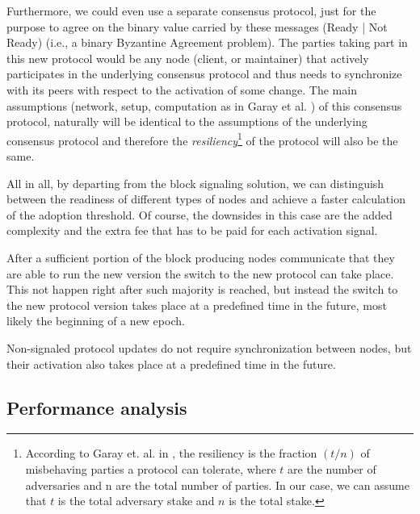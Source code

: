 \documentclass[11pt,a4paper]{article}
\begin{document}
Furthermore, we could even use a separate consensus protocol, just for the
purpose to agree on the binary value carried by these messages (Ready | Not
Ready) (i.e., a binary Byzantine Agreement problem). The parties taking part in
this new protocol would be any node (client, or maintainer) that actively
participates in the underlying consensus protocol and thus needs to synchronize
with its peers with respect to the activation of some change. The main
assumptions (network, setup, computation as in Garay et al. \cite{sok}) of this
consensus protocol, naturally will be identical to the assumptions of the
underlying consensus protocol and therefore the
\emph{resiliency}\footnote{According to Garay et. al. in \cite{sok}, the
  resiliency is the fraction $(t/n)$ of misbehaving parties a protocol can
  tolerate, where $t$ are the number of adversaries and n are the total number
  of parties. In our case, we can assume that $t$ is the total adversary stake
  and $n$ is the total stake.} of the protocol will also be the same.

All in all, by departing from the block signaling solution, we can distinguish
between the readiness of different types of nodes and achieve a faster
calculation of the adoption threshold. Of course, the downsides in this case are
the added complexity and the extra fee that has to be paid for each activation
signal.

After a sufficient portion of the block producing nodes communicate that they
are able to run the new version the switch to the new protocol can take place.
This not happen right after such majority is reached, but instead the switch to
the new protocol version takes place at a predefined time in the future, most
likely the beginning of a new epoch.

Non-signaled protocol updates do not require synchronization between nodes, but
their activation also takes place at a predefined time in the future.



\subsection{Performance analysis}
\label{sec:performance-analysis}
\end{document}
